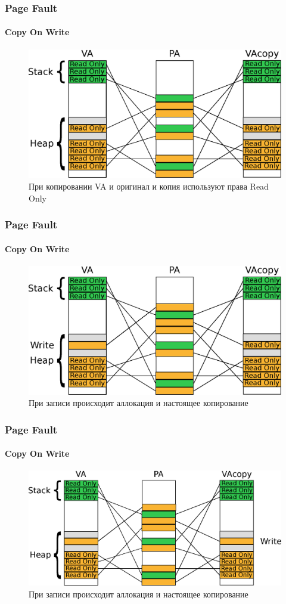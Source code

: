 \begin{frame}
\frametitle{Page Fault}
\framesubtitle{Copy On Write}

\begin{figure}
  \centering\includegraphics[width=.9\linewidth]{page-cow0}
  \caption{При копировании VA и оригинал и копия используют права Read Only}
\end{figure}
\end{frame}

\begin{frame}
\frametitle{Page Fault}
\framesubtitle{Copy On Write}

\begin{figure}
  \centering\includegraphics[width=.9\linewidth]{page-cow1}
  \caption{При записи происходит аллокация и настоящее копирование}
\end{figure}
\end{frame}

\begin{frame}
\frametitle{Page Fault}
\framesubtitle{Copy On Write}

\begin{figure}
  \centering\includegraphics[width=.9\linewidth]{page-cow2}
  \caption{При записи происходит аллокация и настоящее копирование}
\end{figure}
\end{frame}

